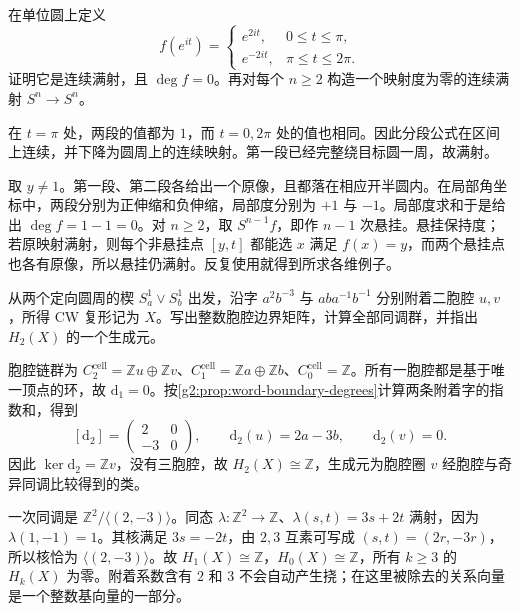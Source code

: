 \begin{exercise}\label{g2:ex:surjective-degree-zero}
	在单位圆上定义
	\[
		f(e^{it})=\begin{cases}e^{2it},&0\le t\le\pi,\\e^{-2it},&\pi\le t\le2\pi.\end{cases}
	\]
	证明它是连续满射，且 \(\deg f=0\)。再对每个 \(n\ge2\) 构造一个映射度为零的连续满射 \(S^n\rightarrow S^n\)。
\end{exercise}
\begin{solution}
	在 \(t=\pi\) 处，两段的值都为 \(1\)，而 \(t=0,2\pi\) 处的值也相同。因此分段公式在区间上连续，并下降为圆周上的连续映射。第一段已经完整绕目标圆一周，故满射。

	取 \(y\ne1\)。第一段、第二段各给出一个原像，且都落在相应开半圆内。在局部角坐标中，两段分别为正伸缩和负伸缩，局部度分别为 \(+1\) 与 \(-1\)。局部度求和于是给出 \(\deg f=1-1=0\)。对 \(n\ge2\)，取 \(S^{n-1}f\)，即作 \(n-1\) 次悬挂。悬挂保持度；若原映射满射，则每个非悬挂点 \([y,t]\) 都能选 \(x\) 满足 \(f(x)=y\)，而两个悬挂点也各有原像，所以悬挂仍满射。反复使用就得到所求各维例子。
\end{solution}

\begin{exercise}\label{g2:ex:two-words-cellular-homology}
	从两个定向圆周的楔 \(S^1_a\vee S^1_b\) 出发，沿字 \(a^2b^{-3}\) 与 \(aba^{-1}b^{-1}\) 分别附着二胞腔 \(u,v\)，所得 CW 复形记为 \(X\)。写出整数胞腔边界矩阵，计算全部同调群，并指出 \(H_2(X)\) 的一个生成元。
\end{exercise}
\begin{solution}
	胞腔链群为 \(C_2^{\mathrm{cell}}=\mathbb Z u\oplus\mathbb Z v\)、\(C_1^{\mathrm{cell}}=\mathbb Z a\oplus\mathbb Z b\)、\(C_0^{\mathrm{cell}}=\mathbb Z\)。所有一胞腔都是基于唯一顶点的环，故 \(\mathrm{d}_1=0\)。按\cref{g2:prop:word-boundary-degrees}计算两条附着字的指数和，得到
	\[
		[\mathrm{d}_2]=\begin{pmatrix}2&0\\-3&0\end{pmatrix},
		\qquad \mathrm{d}_2(u)=2a-3b,\qquad \mathrm{d}_2(v)=0.
	\]
	因此 \(\ker\mathrm{d}_2=\mathbb Z v\)，没有三胞腔，故 \(H_2(X)\cong\mathbb Z\)，生成元为胞腔圈 \(v\) 经胞腔与奇异同调比较得到的类。

	一次同调是 \(\mathbb Z^2/\langle(2,-3)\rangle\)。同态 \(\lambda:\mathbb Z^2\rightarrow\mathbb Z\)、\(\lambda(s,t)=3s+2t\) 满射，因为 \(\lambda(1,-1)=1\)。其核满足 \(3s=-2t\)，由 \(2,3\) 互素可写成 \((s,t)=(2r,-3r)\)，所以核恰为 \(\langle(2,-3)\rangle\)。故 \(H_1(X)\cong\mathbb Z\)，\(H_0(X)\cong\mathbb Z\)，所有 \(k\ge3\) 的 \(H_k(X)\) 为零。附着系数含有 \(2\) 和 \(3\) 不会自动产生挠；在这里被除去的关系向量是一个整数基向量的一部分。
\end{solution}

